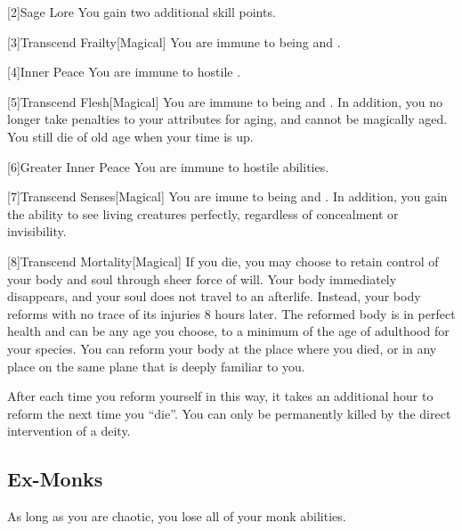         [2]{Sage Lore} You gain two additional skill points.

        [3]{Transcend Frailty}[Magical]
        You are immune to being  and .

        [4]{Inner Peace} You are immune to hostile  .

        [5]{Transcend Flesh}[Magical]
        You are immune to being  and .
        In addition, you no longer take penalties to your attributes for aging, and cannot be magically aged.
        You still die of old age when your time is up.

        [6]{Greater Inner Peace}
        You are immune to hostile  abilities.

        [7]{Transcend Senses}[Magical]
        You are imune to being  and .
        In addition, you gain the ability to see living creatures perfectly, regardless of concealment or invisibility.

        [8]{Transcend Mortality}[Magical]
        If you die, you may choose to retain control of your body and soul through sheer force of will.
        Your body immediately disappears, and your soul does not travel to an afterlife.
        Instead, your body reforms with no trace of its injuries 8 hours later.
        The reformed body is in perfect health and can be any age you choose, to a minimum of the age of adulthood for your species.
        You can reform your body at the place where you died, or in any place on the same plane that is deeply familiar to you.

        After each time you reform yourself in this way, it takes an additional hour to reform the next time you ``die''.
        You can only be permanently killed by the direct intervention of a deity.

    \subsection{Ex-Monks}
        As long as you are chaotic, you lose all of your  monk abilities.

\newpage

